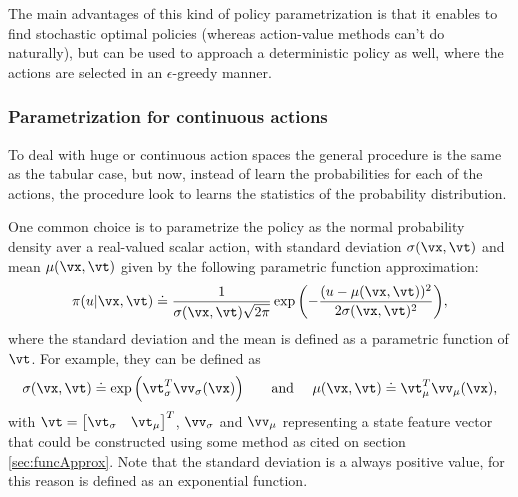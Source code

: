 The main advantages of this kind of policy parametrization is that it enables to find stochastic optimal policies (whereas action-value methods can't do naturally), but can be used to approach a deterministic policy as well, where the actions are selected in an $\epsilon$-greedy manner.



\subsubsection{Parametrization for continuous actions}

To deal with huge or continuous action spaces the general procedure is the same as the tabular case, but now, instead of learn the probabilities for each of the actions, the procedure look to learns the statistics of the probability distribution.

One common choice is to parametrize the policy as the normal probability density aver a real-valued scalar action, with standard deviation $\sigma(\vx,\vt)$ and mean $\mu(\vx,\vt)$ given by the following parametric function approximation:
\begin{equation}
  \pi(u|\vx,\vt) \doteq \frac{1}{\sigma(\vx,\vt)\sqrt{2\pi} } \exp{\left(-\frac{(u-\mu(\vx,\vt))^2}{2\sigma(\vx,\vt)^2}\right)} ,
\end{equation}
where the standard deviation and the mean is defined as a parametric function of $\vt$. For example, they can be defined as
 \begin{equation}
 \sigma(\vx,\vt) \doteq \exp{\left(\vt_\sigma^T\vv_\sigma(\vx)\right)} \quad \quad \text{and }
   \quad \mu(\vx,\vt) \doteq \vt_\mu^T\vv_\mu(\vx) ,
\end{equation}
with $\vt= \begin{bmatrix} \vt_\sigma & \vt_\mu \end{bmatrix}^T$,  $\vv_\sigma$ and $\vv_\mu$ representing a state feature vector that could be constructed using some method as cited on section \eqref{sec:funcApprox}.
Note that the standard deviation is a always positive value, for this reason is defined as an exponential function.


